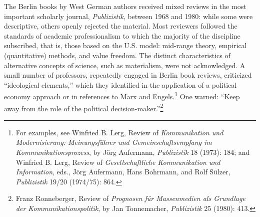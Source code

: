 \documentclass{tufte-handout}
\begin{document}
The Berlin books by West German authors received mixed reviews in the
most important scholarly journal, \emph{Publizistik}, between 1968 and
1980: while some were descriptive, others openly rejected the material.
Most reviewers followed the standards of academic professionalism to
which the majority of the discipline subscribed, that is, those based on
the U.S. model: mid-range theory, empirical (quantitative) methods, and
value freedom. The distinct characteristics of alternative concepts of
science, such as materialism, were not acknowledged. A small number of
professors, repeatedly engaged in Berlin book reviews, criticized
``ideological elements,'' which they identified in the application of a
political economy approach or in references to Marx and
Engels.\footnote{For examples, see Winfried B. Lerg, Review of
  \emph{Kommunikation und Modernisierung: Meinungsführer und
  Gemeinschaftsempfang im Kommunikationsprozess}, by Jörg Aufermann,
  \emph{Publizistik} 18 (1973): 184; and Winfried B. Lerg, Review of
  \emph{Gesellschaftliche Kommunikation und Information}, eds., Jörg
  Aufermann, Hans Bohrmann, and Rolf Sülzer, \emph{Publizistik} 19/20
  (1974/75): 864.} One warned: ``Keep away from the role of the
political decision-maker.''\footnote{Franz Ronneberger, Review of
  \emph{Prognosen für Massenmedien als Grundlage der
  Kommunikationspolitik}, by Jan Tonnemacher, \emph{Publizistik} 25
  (1980): 413.}
\end{document}
